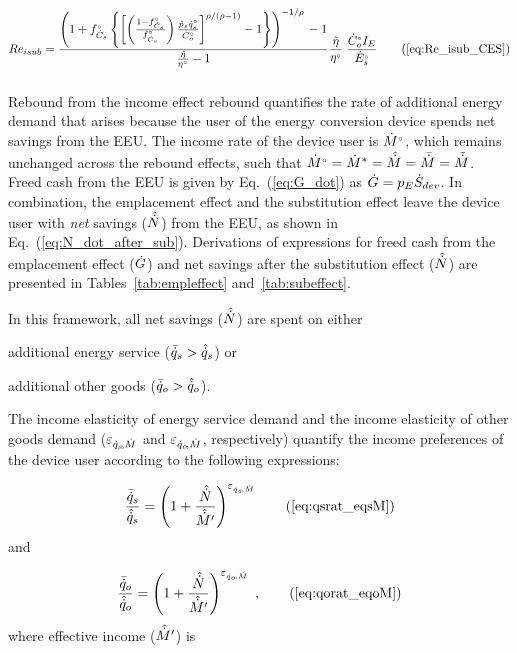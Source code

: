\begin{equation}
  Re_{isub} = \ReisubCES{} \tag{\ref{eq:Re_isub_CES}}
\end{equation}


\subsubsection{\Inceffect{}} 
\label{sec:Re_inc}

Rebound from the income effect rebound quantifies the rate of additional energy demand 
that arises because the user of the energy conversion device spends net
savings from the EEU.
The income rate of the device user is ${}{\dot{M}}^{\scriptscriptstyle \circ}$, 
which remains unchanged across the rebound effects, 
such that
${}{\dot{M}}^{\scriptscriptstyle \circ} = {\dot{M}}^* = \hat{\dot{M}} = \bar{\dot{M}} = \tilde{\dot{M}}$.
Freed cash from the EEU is given by Eq.~(\ref{eq:G_dot})
as $\dot{G} = p_E \dot{S}_{dev}$. 
In combination, the emplacement effect and
the substitution effect leave the device user with
\emph{net} savings ($\hat{\dot{N}}$) from the EEU,
as shown in Eq.~(\ref{eq:N_dot_after_sub}).
Derivations of expressions for 
freed cash from the emplacement effect ($\dot{G}$) and
net savings after the substitution effect ($\hat{\dot{N}}$)
are presented in Tables~\ref{tab:empleffect} and~\ref{tab:subeffect}.

In this framework, all net savings ($\hat{\dot{N}}$) are spent on either 
%
\begin{enumerate*}[label={(\roman*)}]
	
  \item additional energy service ($\bar{\dot{q}}_s > \hat{\dot{q}}_s$) or
  
  \item additional other goods ($\bar{\dot{q}}_o > \hat{\dot{q}}_o$).
    
\end{enumerate*}
%
The income elasticity of energy service demand and 
the income elasticity of other goods demand 
($\varepsilon_{\dot{q}_s\!,\dot{M}}$ and $\varepsilon_{\dot{q}_o\!,\dot{M}}$, respectively)
quantify the income preferences of the device user according to the following expressions:

\begin{equation}
  \incprefseqn \tag{\ref{eq:qsrat_eqsM}}
\end{equation}
%
and

\begin{equation}
  \incprefoeqn \; , \tag{\ref{eq:qorat_eqoM}}
\end{equation}
%
where effective income ($\hat{\dot{M}}^\prime$) is

